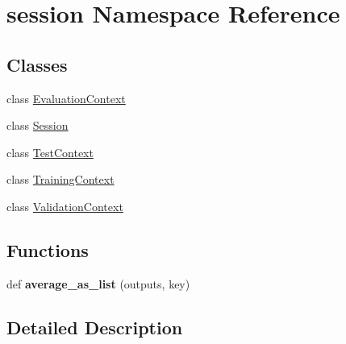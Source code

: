 \hypertarget{namespacesession}{}\section{session Namespace Reference}
\label{namespacesession}
\subsection*{Classes}
\begin{DoxyCompactItemize}
\item 
class \hyperlink{classsession_1_1EvaluationContext}{Evaluation\+Context}
\item 
class \hyperlink{classsession_1_1Session}{Session}
\item 
class \hyperlink{classsession_1_1TestContext}{Test\+Context}
\item 
class \hyperlink{classsession_1_1TrainingContext}{Training\+Context}
\item 
class \hyperlink{classsession_1_1ValidationContext}{Validation\+Context}
\end{DoxyCompactItemize}
\subsection*{Functions}
\begin{DoxyCompactItemize}
\item 
def {\bfseries average\+\_\+as\+\_\+list} (outputs, key)\hypertarget{namespacesession_a5a980a1d9f9721a0d7de153cc44b2f6d}{}\label{namespacesession_a5a980a1d9f9721a0d7de153cc44b2f6d}

\end{DoxyCompactItemize}


\subsection{Detailed Description}
\begin{DoxyVerb}\end{DoxyVerb}
 